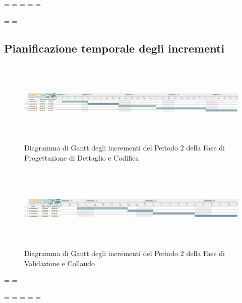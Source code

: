 \newpage
\paperwidth=\pdfpageheight
\paperheight=\pdfpagewidth
\pdfpageheight=\paperheight
\pdfpagewidth=\paperwidth
\headwidth=\textheight

\begingroup 
\vsize=\textwidth
\hsize=\textheight

\subsection{Pianificazione temporale degli incrementi}
\pagestyle{empty}
\begin{figure}[h]
	\centering
	\includegraphics[height = 4cm, width = 24.5cm]{Sezioni/Immagini/DiagrammiGantt/PianificazioneTemporaleIncrementi.png}
	\caption{Diagramma di Gantt degli incrementi del Periodo 2 della Fase di Progettazione di Dettaglio e Codifica}
\end{figure}

\begin{figure}[h]
	\centering
	\includegraphics[height = 4cm, width = 24.5cm]{Sezioni/Immagini/DiagrammiGantt/PianificazioneTemporaleIncrementi2.png}
	\caption{Diagramma di Gantt degli incrementi del Periodo 2 della Fase di Validazione e Collaudo}
\end{figure}

\textwidth=\hsize
\textheight=\vsize

\endgroup
\newpage
\paperwidth=\pdfpageheight
\paperheight=\pdfpagewidth
\pdfpageheight=\paperheight
\pdfpagewidth=\paperwidth
\headwidth=\textwidth